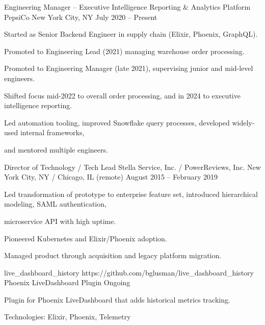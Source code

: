 \documentclass[11pt, a4paper]{awesome-cv}
\begin{document}
\begin{cventries}
  \cventry
    {Engineering Manager – Executive Intelligence Reporting \& Analytics Platform}
    {PepsiCo}
    {New York City, NY}
    {July 2020 – Present}
    {
      \begin{cvitems}
        \item Started as Senior Backend Engineer in supply chain (Elixir, Phoenix, GraphQL).
        \item Promoted to Engineering Lead (2021) managing warehouse order processing.
        \item Promoted to Engineering Manager (late 2021), supervising junior and mid-level engineers.
        \item Shifted focus mid-2022 to overall order processing, and in 2024 to executive intelligence reporting.
        \item Led automation tooling, improved Snowflake query processes, developed widely-used internal frameworks,
        \item and mentored multiple engineers.
      \end{cvitems}
    }
  \cventry
    {Director of Technology / Tech Lead}
    {Stella Service, Inc. / PowerReviews, Inc.}
    {New York City, NY / Chicago, IL (remote)}
    {August 2015 – February 2019}
    {
      \begin{cvitems}
        \item Led transformation of prototype to enterprise feature set, introduced hierarchical modeling, SAML authentication,
        \item microservice API with high uptime.
        \item Pioneered Kubernetes and Elixir/Phoenix adoption.
        \item Managed product through acquisition and legacy platform migration.
      \end{cvitems}
    }
\end{cventries}

\begin{cventries}
  \cventry
    {live\_dashboard\_history}
    {https://github.com/bglusman/live\_dashboard\_history}
    {Phoenix LiveDashboard Plugin}
    {Ongoing}
    {
      \begin{cvitems}
        \item Plugin for Phoenix LiveDashboard that adds historical metrics tracking.
        \item Technologies: Elixir, Phoenix, Telemetry
      \end{cvitems}
    }
\end{cventries}
\end{document}

